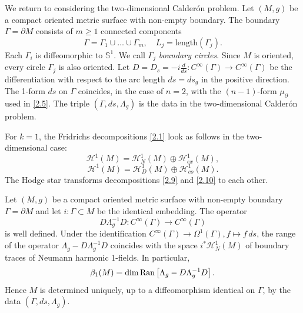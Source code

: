 \documentclass[12pt,reqno]{amsart}
\begin{document}
\bigskip

We return to considering the two-dimensional Calder\'{o}n problem. Let $(M,g)$ be a compact oriented metric surface with non-empty boundary. The boundary $\Gamma=\partial M$ consists of $m\ge1$ connected components
\begin{equation}
\Gamma=\Gamma_1\cup\dots\cup\Gamma_m,\quad L_j=\mbox{length}(\Gamma_j).
                                \label{2.8}
\end{equation}
Each $\Gamma_i$ is diffeomorphic to ${\mathbb S}^1$. We call $\Gamma_j$ {\it boundary circles}.
Since $M$ is oriented, every circle $\Gamma_j$ is also oriented.
Let
$
D=D_s=-i\frac{d}{ds}:C^\infty(\Gamma)\to C^\infty(\Gamma)
$
be the differentiation with respect to the arc length $ds=ds_g$ in the positive direction. The 1-form $ds$ on $\Gamma$ coincides, in the case of $n=2$, with the $(n-1)$-form $\mu_\partial$ used in \eqref{2.5}. The triple $(\Gamma,ds,\Lambda_g)$ is the data in the two-dimensional Calder\'{o}n problem.

For $k=1$, the Fridrichs decompositions \eqref{2.1} look as follows in the two-dimensional case:
\begin{equation}
{\mathcal H}^1(M)={\mathcal H}^1_N(M)\oplus{\mathcal H}^1_{{ex}}(M),
                                \label{2.9}
\end{equation}
\begin{equation}
{\mathcal H}^1(M)={\mathcal H}^1_D(M)\oplus{\mathcal H}^1_{{co}}(M).
                                \label{2.10}
\end{equation}
The Hodge star transforms decompositions \eqref{2.9} and \eqref{2.10} to each other.

\begin{theorem} \label{Th2.1}
Let $(M,g)$ be a compact oriented metric surface with non-empty boundary $\Gamma=\partial M$ and let $i:\Gamma\subset M$ be the identical embedding. The operator
\begin{equation}
D\Lambda_g^{-1} D:C^\infty(\Gamma)\to C^\infty(\Gamma)
                                \label{2.11}
\end{equation}
is well defined. Under the identification $C^\infty(\Gamma)\to\Omega^1(\Gamma), f\mapsto f\,ds$, the range of the operator $\Lambda_g-D\Lambda_g^{-1} D$ coincides with the space $i^*{\mathcal H}^1_N(M)$ of boundary traces of Neumann harmonic 1-fields. In particular,
$$
\beta_1(M)=\mbox{\rm dim}\,\mbox{\rm Ran}
\left[\Lambda_g-D\Lambda_g^{-1} D\right].
$$
Hence $M$ is determined uniquely, up to a diffeomorphism identical on $\Gamma$, by the data $(\Gamma,ds,\Lambda_g)$.
\end{theorem}
\end{document}
